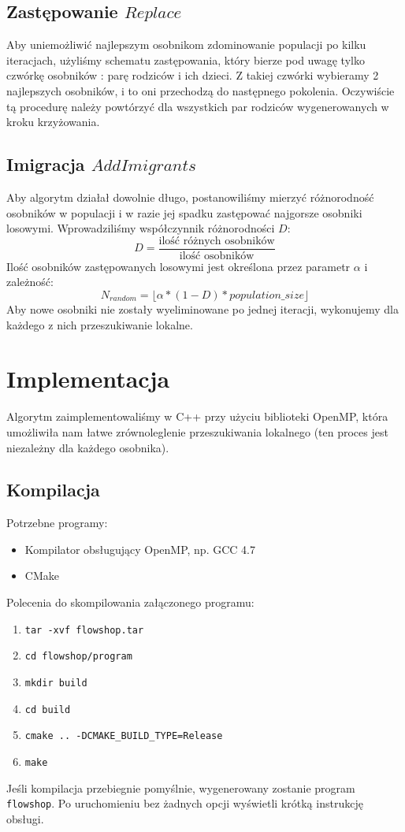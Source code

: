 \documentclass[11pt, a4wide]{article}
\begin{document}
\subsection{Zastępowanie $Replace$}
Aby uniemożliwić najlepszym osobnikom zdominowanie populacji po kilku iteracjach, użyliśmy schematu
zastępowania, który bierze pod uwagę tylko czwórkę osobników : parę rodziców i ich dzieci. Z takiej
czwórki wybieramy 2 najlepszych osobników, i to oni przechodzą do następnego pokolenia. Oczywiście
tą procedurę należy powtórzyć dla wszystkich par rodziców wygenerowanych w kroku krzyżowania.

\subsection{Imigracja $AddImigrants$}
Aby algorytm działał dowolnie długo, postanowiliśmy mierzyć różnorodność osobników w populacji i w razie jej
spadku zastępować najgorsze osobniki losowymi. Wprowadziliśmy współczynnik różnorodności $D$:
$$ D = \frac{\text{ilość różnych osobników}}{\text{ilość osobników}} $$
Ilość osobników zastępowanych losowymi jest określona przez parametr $\alpha$ i zależność:
$$ N_{random} = \lfloor \alpha * (1 - D) * population\_size  \rfloor $$
Aby nowe osobniki nie zostały wyeliminowane po jednej iteracji, wykonujemy dla każdego z nich przeszukiwanie
lokalne.




\section{Implementacja}
Algorytm zaimplementowaliśmy w C++ przy użyciu biblioteki OpenMP, która umożliwiła nam łatwe zrównoleglenie
przeszukiwania lokalnego (ten proces jest niezależny dla każdego osobnika).

\subsection{Kompilacja}
Potrzebne programy:
\begin{itemize}
  \item Kompilator obsługujący OpenMP, np. GCC 4.7
  \item CMake
\end{itemize}
Polecenia do skompilowania załączonego programu:
\begin{enumerate}
  \item \verb|tar -xvf flowshop.tar|
  \item \verb|cd flowshop/program|
  \item \verb|mkdir build|
  \item \verb|cd build|
  \item \verb|cmake .. -DCMAKE_BUILD_TYPE=Release|
  \item \verb|make|
\end{enumerate}
Jeśli kompilacja przebiegnie pomyślnie, wygenerowany zostanie program \verb|flowshop|. Po uruchomieniu
bez żadnych opcji wyświetli krótką instrukcję obsługi.
\end{document}
